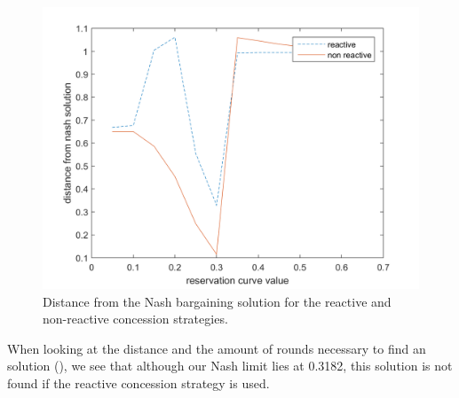 \begin{figure}[h]
	\centering
	\includegraphics[width=0.9\linewidth]{img/reactivevsnonreactive}
	\caption{Distance from the Nash bargaining solution for the reactive and non-reactive concession strategies. }
	\label{fig:reactivevsnon-reactive}
\end{figure}

When looking at the distance and the amount of rounds necessary to find an solution (), we see that although our Nash limit lies at 0.3182, this solution is not found if the reactive concession strategy is used. 

